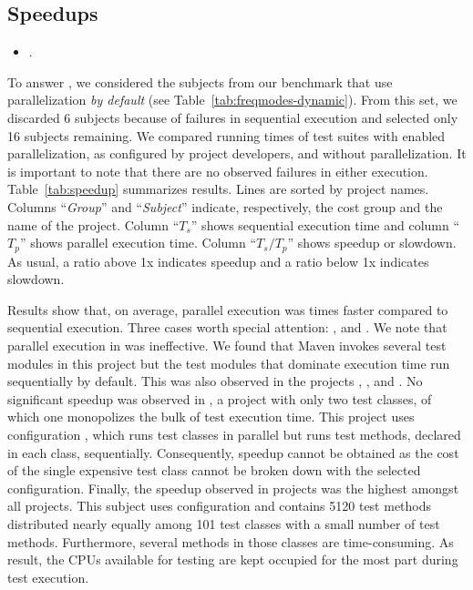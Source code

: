 \documentclass[10pt,journal,compsoc]{IEEEtran}
\begin{document}
\subsection{Speedups}
\label{sec:rqD}

\begin{itemize}
    \item \numRQSpeedupOne{}. \textbf{\RQSpeedupOne}
\end{itemize}

To answer \numRQSpeedupOne{}, we considered the \numProjectsPar{}
subjects from our benchmark that use parallelization \emph{by default}
(see Table~\ref{tab:freqmodes-dynamic}). From this set, we discarded 6 subjects because of failures in sequential execution and selected only 16 subjects remaining. We compared running times
of test suites with enabled parallelization, as configured by project
developers, and without parallelization. It is important to note that
there are no observed failures in either execution.
Table~\ref{tab:speedup} summarizes results.
Lines are sorted by project names.
Columns ``\emph{Group}'' and ``\emph{Subject}'' indicate, respectively,
the cost group and the name of the project.
Column ``$T_s$'' shows sequential execution time and column ``$T_p$''
shows parallel execution time.
Column ``$T_s/T_p$'' shows speedup or slowdown.
As usual, a ratio above 1x indicates speedup and a ratio below 1x
indicates slowdown.


Results show that, on average, parallel execution was
\avgSpeedup{} times faster compared to sequential execution.
Three cases worth special attention: ,  and .
We note that parallel execution in  was
ineffective.  We found that Maven invokes several test modules in this
project but the test modules that dominate execution time run
sequentially by default. This was also observed in the projects , ,  and .
No significant speedup was observed in , a project with
only two test classes, of which one monopolizes the bulk of test
execution time.
This project uses configuration \ParClassSeqMeth{}, which runs test
classes in parallel but runs test methods, declared in each class,
sequentially.
Consequently, speedup cannot be obtained as the cost of the single
expensive test class cannot be broken down with the selected
configuration.
Finally, the speedup observed in projects   was
the highest amongst all projects. This subject uses configuration
\ParClassSeqMeth{} and contains 5120 test methods distributed nearly
equally among 101 test classes with a small number of test methods.
Furthermore, several methods in those classes are time-consuming.
As result, the CPUs available for testing are kept occupied for the
most part during test execution.
\end{document}
